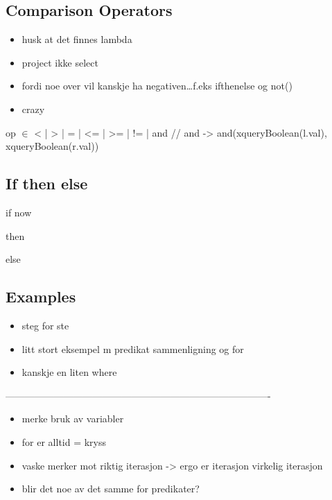 \subsection{Comparison Operators}
\label{sect:translation:compOps}

\begin{itemize}
  \item husk at det finnes lambda
  \item project ikke select
  \item fordi noe over vil kanskje ha negativen\ldots f.eks ifthenelse og not()
  \item crazy
\end{itemize}
op $\in$ {< | > | = | <= | >= | != | and }        // and ->
and(xqueryBoolean(l.val), xqueryBoolean(r.val))

\subsection{If then else}
\label{sect:translation:ifThenElse}
if
now

then

else

\subsection{Examples}
\label{sect:translation:markxremoveExamples}
\begin{itemize}
\item steg for ste
\item litt stort eksempel m predikat sammenligning og for
\item kanskje en liten where
\end{itemize}
----------------------------------------------------------------------------------

\begin{itemize}
\item merke bruk av variabler
\item for er alltid = kryss
\item vaske merker mot riktig iterasjon -> ergo er iterasjon virkelig iterasjon
\item blir det noe av det samme for predikater?
\end{itemize}